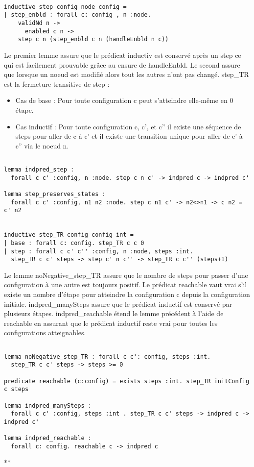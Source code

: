 \documentclass[11pt]{article}
\begin{document}
\begin{verbatim}

inductive step config node config =
| step_enbld : forall c: config , n :node.
    validNd n ->
      enabled c n ->
	step c n (step_enbld c n (handleEnbld n c))

\end{verbatim}
Le premier lemme assure que le prédicat inductiv est conservé après un step ce qui est facilement prouvable grâce au ensure de handleEnbld.
Le second assure que lorsque un noeud est modifié alors tout les autres n'ont pas changé. 
step\_TR est la fermeture transitive de step : 
\begin{itemize}
\item Cas de base : Pour toute configuration c peut s'atteindre elle-même en 0 étape.
\item Cas inductif : Pour toute configuration c, c', et c'' il existe une séquence de steps pour aller de c à c' et il existe une transition unique pour aller de c' à c'' via le noeud n.
\end{itemize}
\begin{verbatim}

lemma indpred_step :
  forall c c' :config, n :node. step c n c' -> indpred c -> indpred c'

lemma step_preserves_states :
  forall c c' :config, n1 n2 :node. step c n1 c' -> n2<>n1 -> c n2 = c' n2


inductive step_TR config config int =
| base : forall c: config. step_TR c c 0
| step : forall c c' c'' :config, n :node, steps :int.
  step_TR c c' steps -> step c' n c'' -> step_TR c c'' (steps+1)

\end{verbatim}
Le lemme noNegative\_step\_TR assure que le nombre de steps pour passer d'une configuration à une autre est toujours positif.
Le prédicat reachable vaut vrai s'il existe un nombre d'étape pour atteindre la configuration c depuis la configuration initiale.
indpred\_manySteps assure que le prédicat inductif est conservé par plusieurs étapes.
indpred\_reachable étend le lemme précédent à l'aide de reachable en assurant que le prédicat inductif reste vrai pour toutes les configurations atteignables. 
\begin{verbatim}

lemma noNegative_step_TR : forall c c': config, steps :int.
  step_TR c c' steps -> steps >= 0

predicate reachable (c:config) = exists steps :int. step_TR initConfig c steps

lemma indpred_manySteps :
  forall c c' :config, steps :int . step_TR c c' steps -> indpred c -> indpred c'

lemma indpred_reachable :
  forall c: config. reachable c -> indpred c

\end{verbatim}
**
\end{document}
